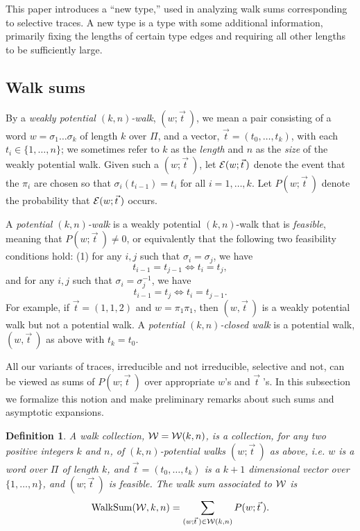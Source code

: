 \documentclass[12pt]{article}
\newtheorem{definition}[theorem]{Definition}
\newcommand{\walksum}[2]{{{\rm WalkSum}(#1,#2)}}
\newcommand{\ce}{{\cal E}}
\newcommand{\cw}{{\cal W}}
\newcommand{\intn}{{\{1,\ldots,n\}}}
\begin{document}
This paper introduces a ``new type,'' used in analyzing walk sums 
corresponding to selective traces.  A new type is a type with
some additional information, primarily fixing the lengths of certain
type edges and requiring all other lengths to be sufficiently large.


\subsection{Walk sums}

By a {\em weakly potential $(k,n)$-walk}, $(w;\vec t\>)$, we mean a pair 
consisting of
a word $w=\sigma_1\ldots\sigma_k$ of length $k$
over $\Pi$,  and a vector,
$\vec t=(t_0,\ldots,t_k)$, with each $t_i\in\intn$; we sometimes refer
to $k$ as the {\em length} and $n$ as the {\em size} of the weakly potential
walk.  Given such a
$(w;\vec t\>)$, let
$\ce(w;\vec t\,)$ denote the event that the $\pi_i$ are chosen so that
$\sigma_i(t_{i-1})=t_i$
for all $i=1,\ldots,k$.
Let $P(w;\vec t\>)$ denote the probability that $\ce(w;\vec t\>)$ occurs.

A {\em potential $(k,n)$-walk} is a weakly potential $(k,n)$-walk that
is {\em feasible}, meaning
that $P(w;\vec t\>)\ne 0$, or equivalently that the 
following two feasibility
conditions hold: (1) for any $i,j$ such that $\sigma_i=\sigma_j$, we have
$$
t_{i-1}=t_{j-1} \Leftrightarrow  t_i=t_j,
$$
and for any $i,j$ such that $\sigma_i=\sigma_j^{-1}$, we have
$$
t_{i-1}=t_{j} \Leftrightarrow  t_i=t_{j-1}.
$$
For example, if $\vec t=(1,1,2)$ and $w=\pi_1\pi_1$, then
$(w,\vec t\>)$ is a weakly potential
walk but not a potential walk.
A {\em potential $(k,n)$-closed walk} is a potential walk, $(w,\vec t\>)$ as 
above with $t_k=t_0$.

All our variants of traces, irreducible and not irreducible, selective
and not, can be viewed as sums of $P(w;\vec t\>)$ over appropriate $w$'s
and $\vec t\;$'s.  In this subsection we formalize this notion and make
preliminary remarks about
such sums and asymptotic expansions.

\begin{definition} A {\em walk collection, $\cw=\cw(k,n)$,} is a collection,
for any two positive integers $k$ and $n$,
of $(k,n)$-potential walks $(w;\vec t\>)$ as above, 
i.e. $w$ is a word over $\Pi$ of length
$k$, and $\vec t=(t_0,\ldots,t_k)$ is a $k+1$ dimensional vector over $\intn$,
and $(w;\vec t\>)$ is feasible.
The {\em walk sum} associated to $\cw$ is
$$
\walksum{\cw}{k,n}=\sum_{(w;\vec t\>)\in\cw(k,n)} P(w;\vec t\>).
$$
\end{definition}
\end{document}
